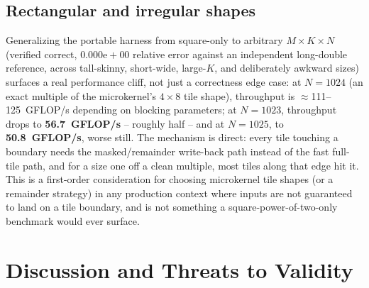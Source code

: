\documentclass[acmsmall]{acmart}
\begin{document}
\subsection{Rectangular and irregular shapes}
Generalizing the portable harness from square-only to arbitrary
$M{\times}K{\times}N$ (verified correct, $0.000\mathrm{e}{+}00$ relative
error against an independent long-double reference, across tall-skinny,
short-wide, large-$K$, and deliberately awkward sizes) surfaces a real
performance cliff, not just a correctness edge case: at $N{=}1024$
(an exact multiple of the microkernel's $4\times8$ tile shape),
throughput is $\approx$111--125~GFLOP/s depending on blocking
parameters; at $N{=}1023$, throughput drops to \textbf{56.7~GFLOP/s} --
roughly half -- and at $N{=}1025$, to \textbf{50.8~GFLOP/s}, worse
still. The mechanism is direct: every tile touching a boundary needs the
masked/remainder write-back path instead of the fast full-tile path,
and for a size one off a clean multiple, most tiles along that edge hit
it. This is a first-order consideration for choosing microkernel tile
shapes (or a remainder strategy) in any production context where inputs
are not guaranteed to land on a tile boundary, and is not something a
square-power-of-two-only benchmark would ever surface.

\section{Discussion and Threats to Validity}
\label{sec:threats}
\end{document}
